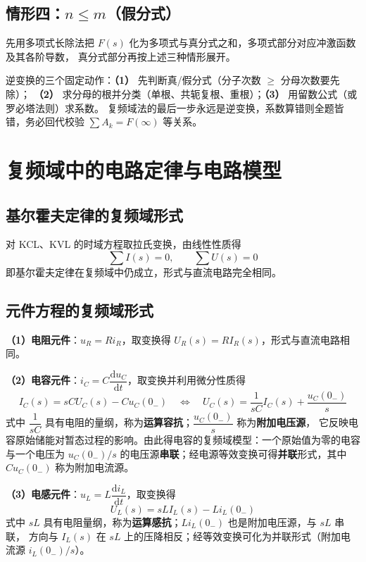 \subsection{情形四：$n\le m$（假分式）}
先用多项式长除法把 $F(s)$ 化为多项式与真分式之和，多项式部分对应冲激函数及其各阶导数，
真分式部分再按上述三种情形展开。

\begin{corepoint}{逆变换的三个固定动作：\textbf{（1）} 先判断真/假分式（分子次数 $\ge$ 分母次数要先除）；
\textbf{（2）} 求分母的根并分类（单根、共轭复根、重根）；\textbf{（3）} 用留数公式（或罗必塔法则）求系数。
复频域法的最后一步永远是逆变换，系数算错则全题皆错，务必回代校验 $\sum A_k=F(\infty)$ 等关系。}
\end{corepoint}

\section{复频域中的电路定律与电路模型}

\subsection{基尔霍夫定律的复频域形式}
对 KCL、KVL 的时域方程取拉氏变换，由线性性质得
\begin{equation}
  \sum I(s)=0,\qquad \sum U(s)=0
\end{equation}
即基尔霍夫定律在复频域中仍成立，形式与直流电路完全相同。

\subsection{元件方程的复频域形式}
\textbf{（1）电阻元件}：$u_R=Ri_R$，取变换得 $U_R(s)=RI_R(s)$，形式与直流电路相同。

\textbf{（2）电容元件}：$i_C=C\dfrac{\mathrm{d}u_C}{\mathrm{d}t}$，取变换并利用微分性质得
\begin{equation}
  I_C(s)=sCU_C(s)-Cu_C(0_-)
  \quad\Longleftrightarrow\quad
  U_C(s)=\frac{1}{sC}I_C(s)+\frac{u_C(0_-)}{s}
  \label{eq:ch9-cap}
\end{equation}
式中 $\dfrac{1}{sC}$ 具有电阻的量纲，称为\textbf{运算容抗}；$\dfrac{u_C(0_-)}{s}$ 称为\textbf{附加电压源}，
它反映电容原始储能对暂态过程的影响。由此得电容的复频域模型：一个原始值为零的电容与一个电压为
$u_C(0_-)/s$ 的电压源\textbf{串联}；经电源等效变换可得\textbf{并联}形式，其中 $Cu_C(0_-)$ 称为附加电流源。

\textbf{（3）电感元件}：$u_L=L\dfrac{\mathrm{d}i_L}{\mathrm{d}t}$，取变换得
\begin{equation}
  U_L(s)=sLI_L(s)-Li_L(0_-)
  \label{eq:ch9-ind}
\end{equation}
式中 $sL$ 具有电阻量纲，称为\textbf{运算感抗}；$Li_L(0_-)$ 也是附加电压源，与 $sL$ 串联，
方向与 $I_L(s)$ 在 $sL$ 上的压降相反；经等效变换可化为并联形式（附加电流源 $i_L(0_-)/s$）。

